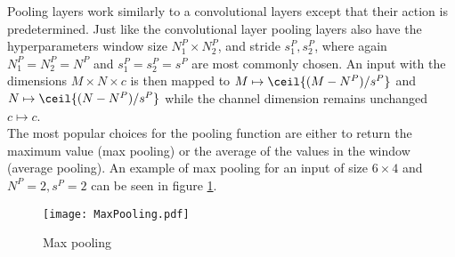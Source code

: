 
Pooling layers work similarly to a convolutional layers except that their action is predetermined. Just like the convolutional layer pooling layers also have the hyperparameters window size $N^P_1 \times N^P_2$, and stride $s_1^P,s_2^P$, where again $N^P_1 = N^P_2 = N^P$ and $s_1^P=s_2^P=s^P$ are most commonly chosen. An input with the  dimensions $M \times N \times c$ is then mapped to  $M \mapsto \ceil{(M-N^P)/s^P} $ and $N \mapsto \ceil{(N-N^P)/s^P}$ while the channel dimension remains unchanged $c \mapsto c$.\\

The most popular choices for the pooling function are either to return the maximum value (max pooling) or the average of the values in the window (average pooling). An example of max pooling for an input of size $6\times 4$ and $N^P = 2, s^P = 2$  can be seen in figure \ref{fig:MaxPooling}.\\

\begin{figure}[H]
\centering
\texttt{[image: MaxPooling.pdf]}
\caption{Max pooling}
\label{fig:MaxPooling}
\end{figure}


